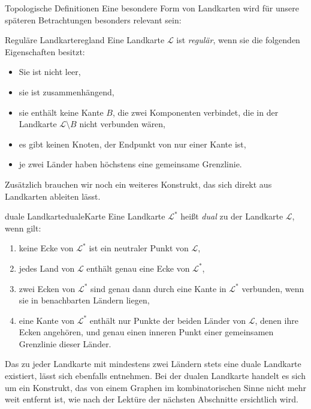 \begin{section}{Topologische Definitionen}
 Eine besondere Form von Landkarten wird für unsere späteren Betrachtungen besonders relevant sein:
 
 \begin{definitionl}{Reguläre Landkarte}{regland}
  Eine Landkarte $\mathcal{L}$ ist \textit{regulär}, wenn sie die folgenden Eigenschaften besitzt:
  \begin{itemize}
   \item Sie ist nicht leer,
   \item sie ist zusammenhängend,
   \item sie enthält keine Kante $B$, die zwei Komponenten verbindet, die in der Landkarte $\mathcal{L} \setminus B$ nicht verbunden wären,
   \item es gibt keinen Knoten, der Endpunkt von nur einer Kante ist,
   \item je zwei Länder haben höchstens eine gemeinsame Grenzlinie.
  \end{itemize}
 \end{definitionl}
 
 Zusätzlich brauchen wir noch ein weiteres Konstrukt, das sich direkt aus Landkarten ableiten lässt.

 \begin{definitionl}{duale Landkarte}{dualeKarte}
  Eine Landkarte $\mathcal{L}^*$ heißt \textit{dual} zu der Landkarte $\mathcal{L}$, wenn gilt:
  \begin{enumerate}
   \item keine Ecke von $\mathcal{L}^*$ ist ein neutraler Punkt von $\mathcal{L}$,
   \item jedes Land von $\mathcal{L}$ enthält genau eine Ecke von $\mathcal{L}^*$,
   \item zwei Ecken von $\mathcal{L}^*$ sind genau dann durch eine Kante in $\mathcal{L}^*$ verbunden, wenn sie in benachbarten Ländern liegen,
   \item eine Kante von $\mathcal{L}^*$ enthält nur Punkte der beiden Länder von $\mathcal{L}$, denen ihre Ecken angehören, und genau einen inneren Punkt einer gemeinsamen Grenzlinie dieser Länder.
  \end{enumerate}
 \end{definitionl}
 
 Das zu jeder Landkarte mit mindestens zwei Ländern stets eine duale Landkarte existiert, lässt sich ebenfalls \cite{fritsch} entnehmen. Bei der dualen Landkarte handelt es sich um ein Konstrukt, das von einem Graphen im kombinatorischen Sinne nicht mehr weit entfernt ist, wie nach der Lektüre der nächsten Abschnitte ersichtlich wird.
 

\end{section}
